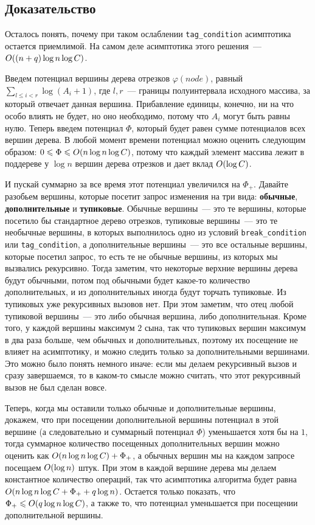 \subsection{Доказательство}

Осталось понять, почему при таком ослаблении \verb+tag_condition+ асимптотика остается приемлимой. На самом деле асимптотика этого решения~--- $O((n + q) \log n \log C)$.

Введем потенциал вершины дерева отрезков $\varphi(node)$, равный $\sum_{l \le i < r} \log (A_i + 1)$, где $l, r$~--- границы полуинтервала исходного массива, за который отвечает данная вершина. Прибавление единицы, конечно, ни на что особо влиять не будет, но оно необходимо, потому что $A_i$ могут быть равны нулю.
Теперь введем потенциал $\Phi$, который будет равен сумме потенциалов всех вершин дерева. В любой момент времени потенциал можно оценить следующим образом: $0 \leqslant \Phi \leqslant O(n \log n \log C)$, потому что каждый элемент массива лежит в поддереве у $\log n$ вершин дерева отрезков и дает вклад $O(\log C)$.

И пускай суммарно за все время этот потенциал увеличился на $\Phi_+$. Давайте разобьем вершины, которые посетит запрос изменения на три вида: \textbf{обычные}, \textbf{дополнительные} и \textbf{тупиковые}.
Обычные вершины~--- это те вершины, которые посетило бы стандартное дерево отрезков, тупиковые вершины~--- это те необычные вершины, в которых выполнилось одно из условий \verb+break_condition+ или \verb+tag_condition+, а дополнительные вершины~--- это все остальные вершины, которые посетил запрос, то есть те не обычные вершины, из которых мы вызвались рекурсивно.
Тогда заметим, что некоторые верхние вершины дерева будут обычными, потом под обычными будет какое-то количество дополнительных, и из дополнительных иногда будут торчать тупиковые. Из тупиковых уже рекурсивных вызовов нет.
При этом заметим, что отец любой тупиковой вершины~--- это либо обычная вершина, либо дополнительная. Кроме того, у каждой вершины максимум $2$ сына, так что тупиковых вершин максимум в два раза больше, чем обычных и дополнительных, поэтому их посещение не влияет на асимптотику, и можно следить только за дополнительными вершинами. Это можно было понять немного иначе: если мы делаем рекурсивный вызов и сразу завершаемся, то в каком-то смысле можно считать, что этот рекурсивный вызов не был сделан вовсе.

Теперь, когда мы оставили только обычные и дополнительные вершины, докажем, что при посещении дополнительной вершины потенциал в этой вершине (а следовательно и суммарный потенциал $\Phi$) уменьшается хотя бы на $1$, тогда суммарное количество посещенных дополнительных вершин можно оценить как $O(n \log n \log C) + \Phi_+$, а обычных вершин мы на каждом запросе посещаем $O(\log n)$ штук. При этом в каждой вершине дерева мы делаем константное количество операций, так что асимптотика алгоритма будет равна $O(n \log n \log C + \Phi_+ + q \log n)$. Остается только показать, что $\Phi_+ \leqslant O(q \log n \log C)$, а также то, что потенциал уменьшается при посещении дополнительной вершины.

